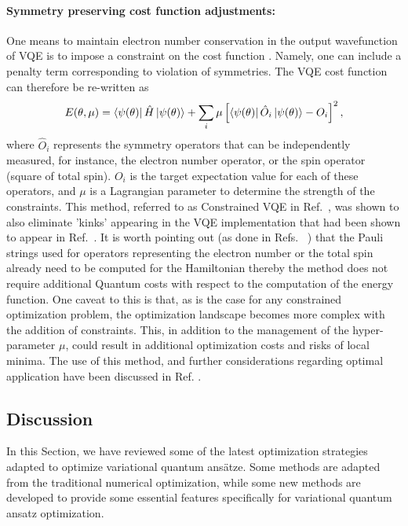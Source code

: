 \paragraph{Symmetry preserving cost function adjustments:} One means to maintain electron number conservation in the output wavefunction of VQE is to impose a constraint on the cost function \cite{mccleanTheoryVariationalHybrid2015, Ryabinkin2019}. Namely, one can include a penalty term corresponding to violation of symmetries. The VQE cost function can therefore be re-written as
\begin{equation}
 E(\theta, \mu) = \bra{\psi(\theta)} \hat{H} \ket{\psi(\theta)} + \sum_i \mu \left[ \bra{\psi(\theta)} \hat{O}_i \ket{\psi(\theta)} - O_i \right]^2,
\end{equation}
where $\hat{O}_i$ represents the symmetry operators that can be independently measured, for instance, the electron number operator, or the spin operator (square of total spin). $O_i$ is the target expectation value for each of these operators, and $\mu$ is a Lagrangian parameter to determine the strength of the constraints. This method, referred to as Constrained VQE in Ref.~\cite{Ryabinkin2019}, was shown to also eliminate 'kinks' appearing in the VQE implementation that had been shown to appear in Ref.~\cite{Kandala2017}. It is worth pointing out (as done in Refs.~ \cite{mccleanTheoryVariationalHybrid2015, Ryabinkin2019}) that the Pauli strings used for operators representing the electron number or the total spin already need to be computed for the Hamiltonian thereby the method does not require additional Quantum costs with respect to the computation of the energy function. One caveat to this is that, as is the case for any constrained optimization problem, the optimization landscape becomes more complex with the addition of constraints. This, in addition to the management of the hyper-parameter $\mu$, could result in additional optimization costs and risks of local minima. The use of this method, and further considerations regarding optimal application have been discussed in Ref. \cite{KuroiwaPenaltyEigensolver2021}.

\subsection{Discussion}

In this Section, we have reviewed some of the latest optimization strategies adapted to optimize variational quantum ans\"atze. Some methods are adapted from the traditional numerical optimization, while some new methods are developed to provide some essential features specifically for variational quantum ansatz optimization. 


